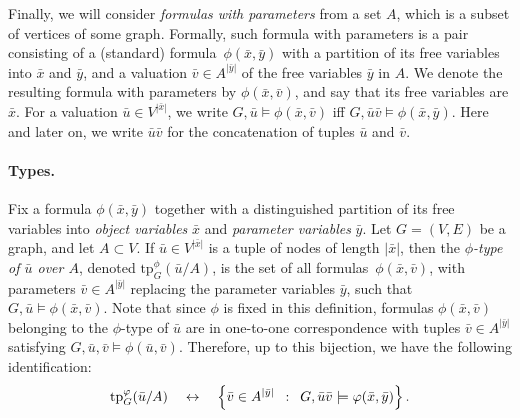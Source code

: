 Finally, we will consider \emph{formulas with parameters}
from a set $A$, which is a subset of vertices of some graph.
Formally, such formula with parameters is a pair consisting of a (standard) formula~$\phi(\bar x,\bar y)$
with a partition of its free variables into $\bar x$ and $\bar y$,
and a valuation $\bar v\in A^{|\bar y|}$ of the free variables $\bar y$ in $A$.
We denote the resulting formula with parameters by $\phi(\bar x,\bar v)$, and say that its free variables 
are $\bar x$. For a valuation $\bar u\in V^{|\bar x|}$,
we write $G,\bar u\models \phi(\bar x,\bar v)$
iff $G,\bar u\bar v\models \phi(\bar x,\bar y)$. Here and later on, we write $\bar u\bar v$ for the concatenation of tuples $\bar u$ and $\bar v$.

\newcommand{\tp}{\mathrm{tp}}

\paragraph{Types.}
Fix a formula $\phi(\bar x,\bar y)$ together with a distinguished partition of its free variables into 
\emph{object variables} $\bar x$ and \emph{parameter variables} $\bar y$. 
Let $G=(V,E)$ be a graph, and let $A\subset V$.
If $\bar u\in V^{|\bar x|}$ is a tuple of 
nodes of length $|\bar x|$, then the 
\emph{$\phi$-type of $\bar u$ over $A$},
denoted $\tp^\phi_G(\bar u/A)$,
is the set of all
formulas~$\phi(\bar x,\bar v)$,
with parameters $\bar v\in A^{|\bar y|}$
replacing the parameter variables $\bar y$,
such that $G,\bar u\models \phi(\bar x,\bar v)$.
Note that since $\phi$ is fixed in this definition, formulas $\phi(\bar x,\bar v)$ belonging to the $\phi$-type of $\bar u$ are in one-to-one correspondence
with tuples $\bar v\in A^{|\bar y|}$ satisfying $G,\bar u,\bar v\models \phi(\bar u,\bar v)$.
Therefore, up to this bijection, we have the following identification:
\begin{equation}\label{eq:bijection}
\tp^\phi_G(\bar u/A)\quad\leftrightarrow\quad\setof{\bar v\in  A^{|\bar y|}}{G, \bar u\bar v\models \phi(\bar x,\bar y)}.
\end{equation}

